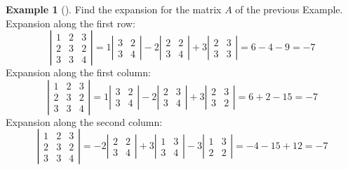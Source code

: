 \documentclass[
  a4paper,
  DIV=11,
  numbers=noendperiod,
  oneside]{scrreprt}
\theoremstyle{definition}
\newtheorem{example}{Example}[chapter]
\theoremstyle{remark}
\begin{document}
\begin{example}[]
Find the expansion for the matrix \(A\) of the previous Example.
Expansion along the first row: \[\left| 
\begin{array}{ccc}
1 & 2 & 3 \\ 
2 & 3 & 2 \\ 
3 & 3 & 4
\end{array}
\right| =  1  \left| \begin{array}{cc}
3 & 2 \\ 
 3 & 4
\end{array} \right| - 2  \left| \begin{array}{cc}
2 & 2 \\ 
3 & 4
\end{array}  \right| +3 \left| \begin{array}{cc}
2 & 3 \\ 
3 & 3
\end{array}  \right| =  6-4 -9 =-7\] Expansion along the first column:
\[\left| 
\begin{array}{ccc}
1 & 2 & 3 \\ 
2 & 3 & 2 \\ 
3 & 3 & 4
\end{array}
\right| =  1  \left| \begin{array}{cc}
3 & 2 \\ 
 3 & 4
\end{array} \right| - 2  \left| \begin{array}{cc}
2 & 3 \\ 
3 & 4
\end{array}  \right| + 3\left| \begin{array}{cc}
2 & 3 \\ 
3 & 2
\end{array}  \right| =6+2-15=-7\] Expansion along the second column:
\[\left| 
\begin{array}{ccc}
1 & 2 & 3 \\ 
2 & 3 & 2 \\ 
3 & 3 & 4
\end{array}
\right| =  - 2  \left| \begin{array}{cc}
2 & 2 \\ 
3 & 4
\end{array}  \right| +3 \left| \begin{array}{cc}
1 & 3 \\ 
3 & 4
\end{array}  \right| -3 \left| \begin{array}{cc}
1 & 3 \\ 
2 & 2
\end{array}  \right| =  -4 -15 +12=-7\]

\end{example}
\end{document}
